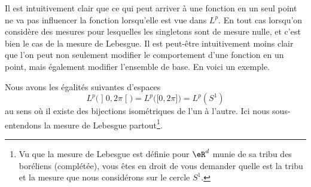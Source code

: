 Il est intuitivement clair que ce qui peut arriver à une fonction en un seul point ne va pas influencer la fonction lorsqu'elle est vue dans \( L^p\). En tout cas lorsqu'on considère des mesures pour lesquelles les singletons sont de mesure nulle, et c'est bien le cas de la mesure de Lebesgue. Il est peut-être intuitivement moins clair que l'on peut non seulement modifier le comportement d'une fonction en un point, mais également modifier l'ensemble de base. En voici un exemple.

\begin{proposition}
	Nous avons les égalités suivantes d'espaces
	\begin{equation}
		L^p\big( \mathopen] 0 , 2\pi \mathclose[ \big)=L^p\big( \mathopen[ 0 , 2\pi \mathclose] \big)=L^p(S^1)
	\end{equation}
	au sens où il existe des bijections isométriques de l'un à l'autre. Ici nous sous-entendons la mesure de Lebesgue partout\footnote{Vu que la mesure de Lebesgue est définie pour \( \eR^d\) munie de sa tribu des boréliens (complétée), vous êtes en droit de vous demander quelle est la tribu et la mesure que nous considérons sur le cercle \( S^1\).}.
\end{proposition}


